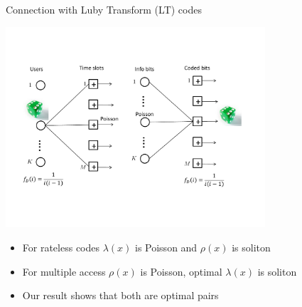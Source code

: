 \begin{frame}{Connection with Luby Transform (LT) codes}
\begin{center}
\includegraphics[width=3.8in]{./Figures/ratelessmaccomparison}
\end{center}
\begin{itemize}
  \item For rateless codes $\lambda(x)$ is Poisson and $\rho(x)$ is soliton
  \item For multiple access $\rho(x)$ is Poisson, \alert{optimal $\lambda(x)$ is soliton}
  \item Our result shows that both are optimal pairs
\end{itemize}
\end{frame}
